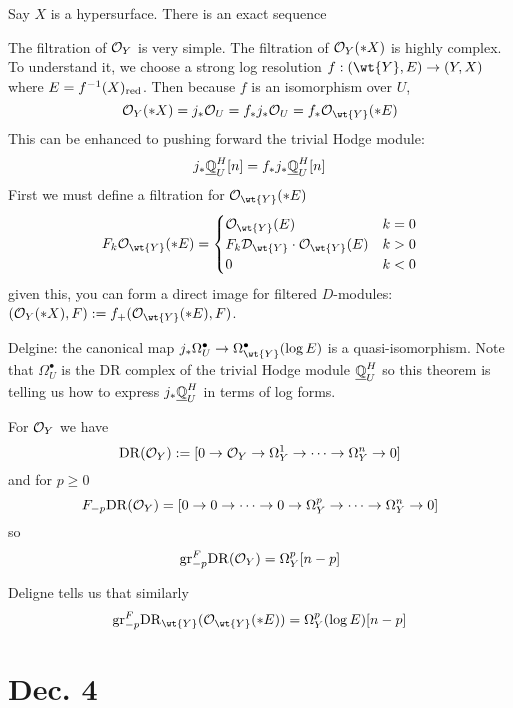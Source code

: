 \documentclass[12pt]{article}
\renewcommand{\gr}{\mathrm{gr}}
\renewcommand{\cH}{\mathcal{H}}
\begin{document}
\begin{example}
Say $X$ is a hypersurface. There is an exact sequence
\begin{center}
\end{center}
The filtration of $\mathcal{O}_{Y}$ is very simple. The filtration of $\mathcal{O}_{Y}(* X)$ is highly complex. To understand it, we choose a strong log resolution $f : (\wt{Y}, E) \to (Y, X)$ where $E = f^{-1}(X)_{\mathrm{red}}$. Then because $f$ is an isomorphism over $U$,
\[ \struct{Y}(*X) = j_* \struct{U} = f_* j_* \struct{U} = f_* \struct{\wt{Y}}(* E) \]
This can be enhanced to pushing forward the trivial Hodge module:
\[ j_* \underline{\mathbb{Q}}_U^H[n] = f_* j_* \underline{\mathbb{Q}}_U^H[n] \]
First we must define a filtration for $\struct{\wt{Y}}(* E)$
\[ F_k \struct{\wt{Y}}(*E) = 
\begin{cases}
\struct{\wt{Y}}(E) & k = 0
\\
F_k \D_{\wt{Y}} \cdot \struct{\wt{Y}}(E) & k > 0
\\
0 & k < 0
\end{cases} \]
given this, you can form a direct image for filtered $D$-modules: $(\struct{Y}(*X), F) := f_+(\struct{\wt{Y}}(*E), F)$.
\end{example}

Delgine: the canonical map $j_* \Omega_U^\bullet \to \Omega_{\wt{Y}}^\bullet(\log{E})$ is a quasi-isomorphism. Note that $\Omega_U^\bullet$ is the DR complex of the trivial Hodge module $\underline{\mathbb{Q}}^H_U$ so this theorem is telling us how to express $j_* \underline{\mathbb{Q}}^H_U$ in terms of log forms. 

\begin{rmk}
For $\mathcal{O}_{Y}$ we have
\[ \mathrm{DR}(\mathcal{O}_{Y}) := [0 \to \mathcal{O}_{Y} \to \Omega_Y^1 \to \cdots \to \Omega_Y^n \to 0] \]
and for $p \ge 0$
\[ F_{-p} \mathrm{DR}(\mathcal{O}_{Y}) = [0 \to 0 \to \cdots \to 0 \to \Omega_Y^p \to \cdots \to \Omega_Y^n \to 0] \]
so 
\[ \gr_{-p}^F \DR(\struct{Y}) = \Omega^p_Y[n-p] \]
\end{rmk}

Deligne tells us that similarly
\[ \gr^F_{-p} \DR_{\wt{Y}}(\struct{\wt{Y}}(*E)) = \Omega_Y^p(\log{E})[n-p] \]

\section{Dec. 4} 
\end{document}
